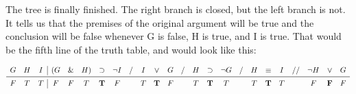 \documentclass[../logic-text.tex]{subfiles}
\begin{document}
The tree is finally finished. The right branch is closed, but the left branch is not. It tells us that the premises of the original argument will be true and the conclusion will be false whenever G is false, H is true, and I is true. That would be the fifth line of the truth table, and would look like this:

\[
\begin{array}{ccc|ccccccccccccccccccccc}
G & H & I & (G & \land & H) & \lif & \lneg I & / & I & \lor & G & / & H & \lif & \lneg G & / & H & \liff & I &  // &  \lneg H & \lor & G \\ \midrule
F & T & T & F  & F     & T  & \mathbf{T}    & F       &  & T & \mathbf{T}    & F &  & T & \mathbf{T}    & T       &  & T & \mathbf{T}     & T &  & F        & \mathbf{F}    & F 
\end{array}
\]
\end{document}
